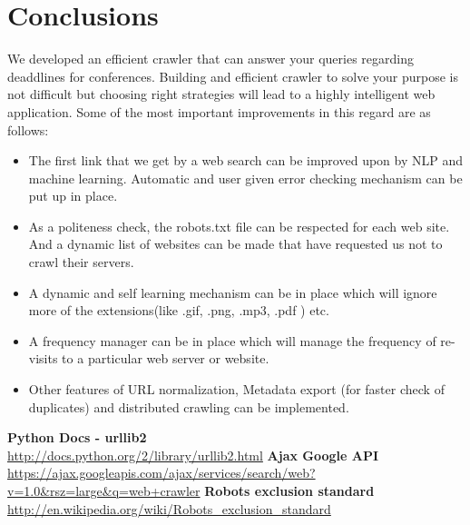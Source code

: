 \documentclass[]{article}
\begin{document}
\section{Conclusions}
We developed an efficient crawler that can answer your queries regarding deaddlines for conferences. Building and efficient crawler to solve your purpose is not difficult but choosing right strategies will lead to a highly intelligent web application. Some of the most important improvements in this regard are as follows:
\begin{itemize}
	\item The first link that we get by a web search can be improved upon by NLP and machine learning. Automatic and user given error 		checking mechanism can be put up in place.
	\item As a politeness check, the robots.txt \cite{robot} file can be respected for each web site. And a dynamic list of websites can be made that 		have requested us not to crawl their servers.
	\item A dynamic and self learning mechanism can be in place which will ignore more of the extensions(like .gif, .png, .mp3, .pdf ) etc.
	\item A frequency manager can be in place which will manage the frequency of re-visits to a particular web server or website.
	\item Other features of URL normalization, Metadata export (for faster check of duplicates) and distributed crawling can be 		implemented.
\end{itemize}

\begin{thebibliography}{9}
	\textbf{Python Docs - urllib2}\\	\url{http://docs.python.org/2/library/urllib2.html}
	\textbf{Ajax Google API}		\url{https://ajax.googleapis.com/ajax/services/search/web?v=1.0&rsz=large&q=web+crawler}
	\textbf{Robots exclusion standard}	\url{http://en.wikipedia.org/wiki/Robots_exclusion_standard}
\end{thebibliography}
\end{document}
